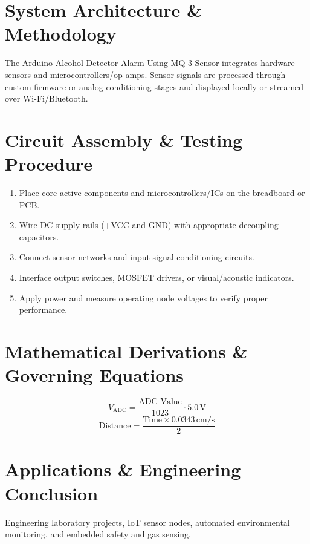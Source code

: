 \documentclass[11pt,a4paper]{article}
\begin{document}
\section{System Architecture \& Methodology}
The Arduino Alcohol Detector Alarm Using MQ-3 Sensor integrates hardware sensors and microcontrollers/op-amps. Sensor signals are processed through custom firmware or analog conditioning stages and displayed locally or streamed over Wi-Fi/Bluetooth.

\section{Circuit Assembly \& Testing Procedure}
\begin{enumerate}
    \item Place core active components and microcontrollers/ICs on the breadboard or PCB.
    \item Wire DC supply rails (+VCC and GND) with appropriate decoupling capacitors.
    \item Connect sensor networks and input signal conditioning circuits.
    \item Interface output switches, MOSFET drivers, or visual/acoustic indicators.
    \item Apply power and measure operating node voltages to verify proper performance.
\end{enumerate}

\section{Mathematical Derivations \& Governing Equations}
\begin{equation}
V_{\text{ADC}} = \frac{\text{ADC\_Value}}{1023} \cdot 5.0\,\text{V}
\end{equation}
\begin{equation}
\text{Distance} = \frac{\text{Time} \times 0.0343\,\text{cm/s}}{2}
\end{equation}

\section{Applications \& Engineering Conclusion}
Engineering laboratory projects, IoT sensor nodes, automated environmental monitoring, and embedded safety and gas sensing.
\end{document}

